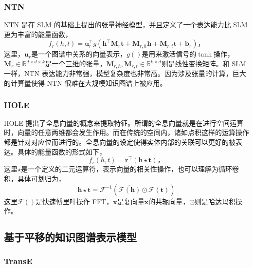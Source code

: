       \subsubsection{NTN}
      NTN \cite{socher2013reasoning} 是在 SLM 的基础上提出的张量神经模型，并且定义了一个表达能力比 SLM 更为丰富的能量函数，
      \begin{equation}
        f_{r}(h, t) = \mathbf{u}_r^\top g (\mathbf{h}^{\top} \mathbf{M}_r \mathbf{t} + \mathbf{M}_{r, h} \mathbf{h} + \mathbf{M}_{r, t}\mathbf{t} + \mathbf{b}_r)，
      \end{equation}
      这里，$\mathbf{u}_r$是一个图谱中关系的向量表示，$g()$是用来激活信号的$\tanh$操作，$\mathbf{M}_r \in \mathbb{R}^{d \times d \times k}$是一个三维的张量，$\mathbf{M}_{r, h}, \mathbf{M}_{r, t} \in  \mathbb{R}^{k\times d}$则是线性变换矩阵。和 SLM 一样，NTN 表达能力非常强，模型复杂度也非常高。因为涉及张量的计算，巨大的计算量使得 NTN 很难在大规模知识图谱上被应用。
      
      \subsubsection{HOLE}

      HOLE \cite{nickel2016holographic} 提出了全息向量的概念来提取特征。所谓的全息向量就是在进行空间运算时，向量的任意两维都会发生作用。而在传统的空间内，诸如点积这样的运算操作都是针对对应位而进行的。全息向量的设定使得实体内部的关联可以更好的被表达。具体的能量函数的形式如下，
      \begin{equation}
        f_{r}(h, t) = \mathbf{r}^\top (\mathbf{h} \star \mathbf{t})，
      \end{equation}
      这里$\star$是一个定义的二元运算符，表示向量的相关性操作，也可以理解为循环卷积，具体可划归为，
      \begin{equation}
        \mathbf{h} \star \mathbf{t} = \mathcal{F}^{-1}(\overline{\mathcal{F}(\mathbf{h})} \odot \mathcal{F}(\mathbf{t}))
      \end{equation}
      这里$\mathcal{F}()$是快速傅里叶操作 FFT，$\overline{\textbf{x}}$是复向量$\textbf{x}$的共轭向量，$\odot$则是哈达玛积操作。

    \subsection{基于平移的知识图谱表示模型}

      \subsubsection{TransE}


